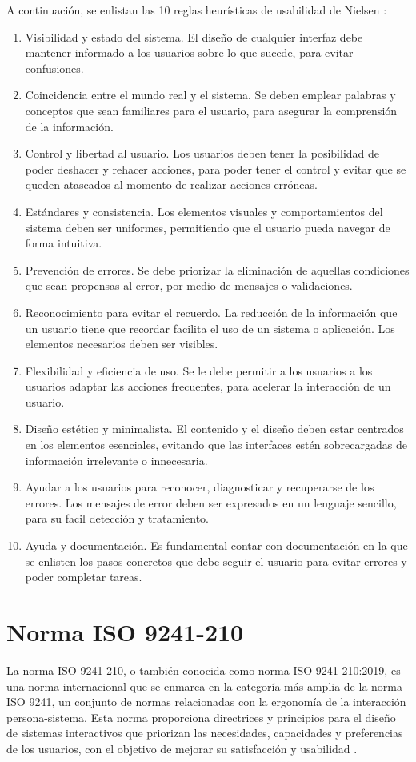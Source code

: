 A continuación, se enlistan las 10 reglas heurísticas de usabilidad de Nielsen \cite{ref61}:
\begin{enumerate}
    \item Visibilidad y estado del sistema. El diseño de cualquier interfaz debe mantener informado a los usuarios sobre lo que sucede, para evitar confusiones.
    \item Coincidencia entre el mundo real y el sistema. Se deben emplear palabras y conceptos que sean familiares para el usuario, para asegurar la comprensión de la información.
    \item Control y libertad al usuario. Los usuarios deben tener la posibilidad de poder deshacer y rehacer acciones, para poder tener el control y evitar que se queden atascados al momento de realizar acciones erróneas.
    \item Estándares y consistencia. Los elementos visuales y comportamientos del sistema deben ser uniformes, permitiendo que el usuario pueda navegar de forma intuitiva.
    \item Prevención de errores. Se debe priorizar la eliminación de aquellas condiciones que sean propensas al error, por medio de mensajes o validaciones.
    \item Reconocimiento para evitar el recuerdo. La reducción de la información que un usuario tiene que recordar facilita el uso de un sistema o aplicación. Los elementos necesarios deben ser visibles.
    \item Flexibilidad y eficiencia de uso. Se le debe permitir a los usuarios a los usuarios adaptar las acciones frecuentes, para acelerar la interacción de un usuario.
    \item Diseño estético y minimalista. El contenido y el diseño deben estar centrados en los elementos esenciales, evitando que las interfaces estén sobrecargadas de información irrelevante o innecesaria.
    \item Ayudar a los usuarios para reconocer, diagnosticar y recuperarse de los errores. Los mensajes de error deben ser expresados en un lenguaje sencillo, para su facil detección y tratamiento.
    \item Ayuda y documentación. Es fundamental contar con documentación en la que se enlisten los pasos concretos que debe seguir el usuario para evitar errores y poder completar tareas.
\end{enumerate}

\section{Norma ISO 9241-210}
La norma ISO 9241-210, o también conocida como norma ISO 9241-210:2019, es una norma internacional que se enmarca en la categoría más amplia de la norma ISO 9241, un conjunto de normas relacionadas con la ergonomía de la interacción persona-sistema. Esta norma proporciona directrices y principios para el diseño de sistemas interactivos que priorizan las necesidades, capacidades y preferencias de los usuarios, con el objetivo de mejorar su satisfacción y usabilidad \cite{ref62}.\\


